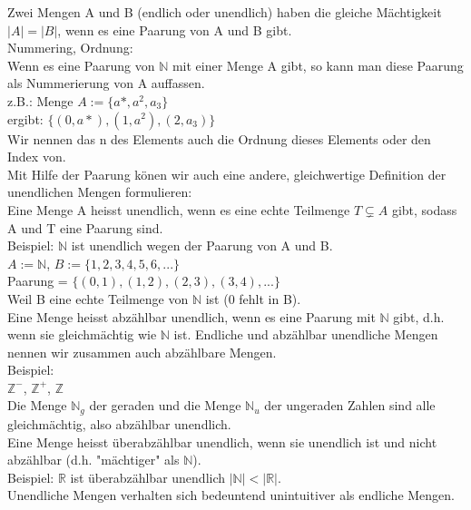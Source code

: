 \documentclass[../gruppenarbeit_1.tex]{subfiles}
\begin{document}
Zwei Mengen A und B (endlich oder unendlich) haben die gleiche Mächtigkeit $|A| = |B|$, wenn es eine Paarung von A und B gibt.\\

Nummering, Ordnung:\\
Wenn es eine Paarung von $\mathbb{N}$ mit einer Menge A gibt, so kann man diese Paarung als Nummerierung von A auffassen. \\
z.B.: Menge $A := \{a*,a^2, a_3\}$\\
ergibt: $\{(0,a*),(1,a^2),(2,a_3)\}$\\

Wir nennen das n des Elements auch die Ordnung dieses Elements oder den Index von.\\

Mit Hilfe der Paarung könen wir auch eine andere, gleichwertige Definition der unendlichen Mengen formulieren:\\
Eine Menge A heisst unendlich, wenn es eine echte Teilmenge $T \subsetneq A$ gibt, sodass A und T eine Paarung sind.\\
Beispiel: $\mathbb{N}$ ist unendlich wegen der Paarung von A und B.\\
$A := \mathbb{N}$, $B := \{1,2,3,4,5,6,...\}$\\
Paarung = $\{(0,1),(1,2),(2,3),(3,4),...\}$\\
Weil B eine echte Teilmenge von $\mathbb{N}$ ist (0 fehlt in B).\\

Eine Menge heisst abzählbar unendlich, wenn es eine Paarung mit $\mathbb{N}$ gibt, d.h. wenn sie gleichmächtig wie $\mathbb{N}$ ist.
Endliche und abzählbar unendliche Mengen nennen wir zusammen auch abzählbare Mengen.\\

Beispiel:\\
$\mathbb{Z}^-$, $\mathbb{Z}^+$, $\mathbb{Z}$\\
Die Menge $\mathbb{N}_g$ der geraden und die Menge $\mathbb{N}_u$ der ungeraden Zahlen sind alle gleichmächtig, also abzählbar unendlich.\\

Eine Menge heisst überabzählbar unendlich, wenn sie unendlich ist und nicht abzählbar (d.h. "mächtiger" als $\mathbb{N}$).\\
Beispiel: $\mathbb{R}$ ist überabzählbar unendlich $|\mathbb{N}| < |\mathbb{R}|$.\\

Unendliche Mengen verhalten sich bedeuntend unintuitiver als endliche Mengen.\\
\end{document}
